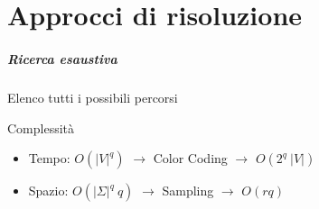 \part{Approcci di risoluzione}

\begin{frame}
	\partpage
	\centering
\end{frame}

\begin{frame}
	\frametitle{Ricerca esaustiva}
	Elenco tutti i possibili percorsi 

	Complessità
	\begin{itemize}
		\item Tempo: $O(|V|^q)$ $\rightarrow$ Color Coding $\rightarrow$ $O(2^q\ |V|)$
		\item Spazio: $O(|\Sigma|^q\ q)$ $\rightarrow$ Sampling $\rightarrow$ $O(rq)$
	\end{itemize}
\end{frame}


